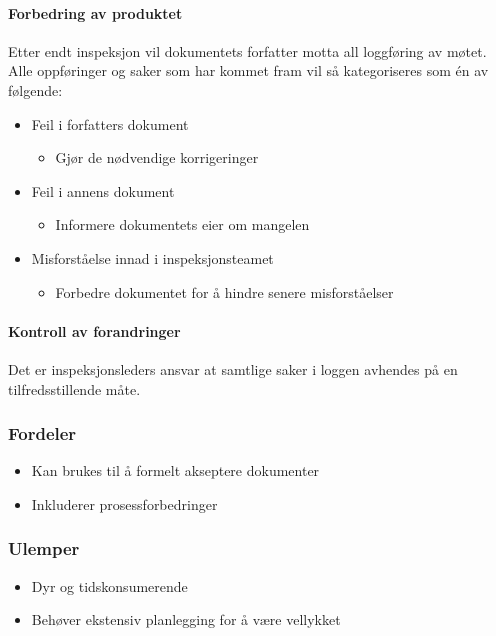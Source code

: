 \paragraph{Forbedring av produktet}

Etter endt inspeksjon vil dokumentets forfatter motta all loggføring av
møtet. Alle oppføringer og saker som har kommet fram vil så
kategoriseres som én av følgende:

\begin{itemize}
\item
  Feil i forfatters dokument
  \begin{itemize}
  \item
    Gjør de nødvendige korrigeringer
  \end{itemize}
\item
  Feil i annens dokument
  \begin{itemize}
  \item
    Informere dokumentets eier om mangelen
  \end{itemize}
\item
  Misforståelse innad i inspeksjonsteamet
  \begin{itemize}
  \item
    Forbedre dokumentet for å hindre senere misforståelser
  \end{itemize}
\end{itemize}
\paragraph{Kontroll av forandringer}

Det er inspeksjonsleders ansvar at samtlige saker i loggen avhendes på
en tilfredsstillende måte.

\subsubsection{Fordeler}

\begin{itemize}
\item
  Kan brukes til å formelt akseptere dokumenter
\item
  Inkluderer prosessforbedringer
\end{itemize}
\subsubsection{Ulemper}

\begin{itemize}
\item
  Dyr og tidskonsumerende
\item
  Behøver ekstensiv planlegging for å være vellykket
\end{itemize}
